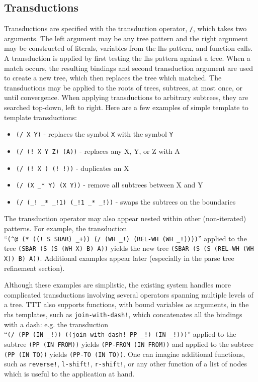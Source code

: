 \documentclass[11pt]{article}
\begin{document}
\subsection*{Transductions}
Transductions are specified with the transduction operator, \texttt{/}, which takes two arguments.  The left argument may be any tree pattern and the right argument may be constructed of literals, variables from the lhs pattern, and function calls.  A transduction is applied by first testing the lhs pattern against a tree.  When a match occurs, the resulting bindings and second transduction argument are used to create a new tree, which then replaces the tree which matched.  The transductions may be applied to the roots of trees, subtrees, at most once, or until convergence.  When applying transductions to arbitrary subtrees, they are searched top-down, left to right. Here are a few examples of simple template to template transductions:
\begin {itemize}
\item  \texttt{(/ X Y)}   - replaces the symbol \texttt{X} with the symbol \texttt{Y}
\item  \texttt{(/ (! X Y Z) (A))}  - replaces any X, Y, or Z with A
\item  \texttt{(/ (! X ) (! !))}  - duplicates an X
\item  \texttt{(/ (X \_* Y) (X Y))}  - remove all subtrees between X and Y
\item  \texttt{(/ (\_! \_* \_!1) (\_!1 \_* \_!))}  - swaps the subtrees on the boundaries
\end {itemize}

The transduction operator may also appear nested within other (non-iterated) patterns. For example,  the transduction\\ ``\texttt{(\^{}@ (* ((! S SBAR) \_+)) (/ (WH \_!) (REL-WH (WH \_!))))}'' applied to the tree \texttt{(SBAR (S (S (WH X) B) A))} yields the new tree \texttt{(SBAR (S (S (REL-WH (WH X)) B) A))}.  Additional examples appear later (especially in the parse tree refinement section).

Although these examples are simplistic, the existing system handles more complicated transductions involving several operators spanning multiple levels of a tree.  TTT also supports functions, with bound variables as arguments, in the rhs templates, such as \texttt{join-with-dash!}, which concatenates all the bindings with a dash:   e.g. the transduction \\ ``\texttt{(/ (PP (IN \_!)) ((join-with-dash! PP \_!) (IN \_!)))}'' applied to the subtree \texttt{(PP (IN FROM))} yields \texttt{(PP-FROM (IN FROM))} and applied to the subtree \texttt{(PP (IN TO))} yields \texttt{(PP-TO (IN TO))}.    One can imagine additional functions, such as \texttt{reverse!}, \texttt{l-shift!}, \texttt{r-shift!}, or any other function of a list of nodes which is useful to the application at hand. 
\end{document}
